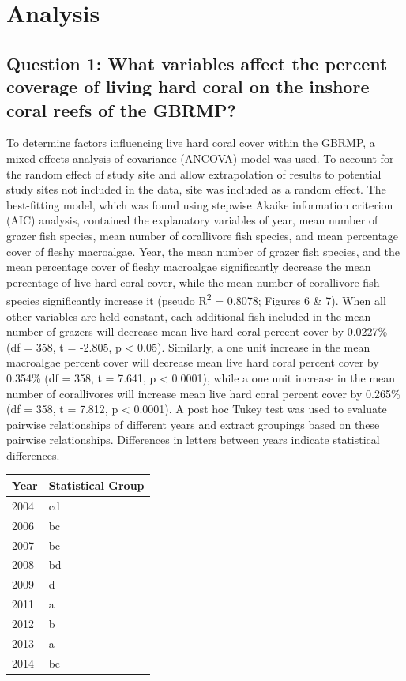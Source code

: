 \documentclass[12pt,]{article}
\begin{document}
\newpage

\hypertarget{analysis}{%
\section{Analysis}\label{analysis}}

\hypertarget{question-1-what-variables-affect-the-percent-coverage-of-living-hard-coral-on-the-inshore-coral-reefs-of-the-gbrmp}{%
\subsection{Question 1: What variables affect the percent coverage of
living hard coral on the inshore coral reefs of the
GBRMP?}\label{question-1-what-variables-affect-the-percent-coverage-of-living-hard-coral-on-the-inshore-coral-reefs-of-the-gbrmp}}

To determine factors influencing live hard coral cover within the GBRMP,
a mixed-effects analysis of covariance (ANCOVA) model was used. To
account for the random effect of study site and allow extrapolation of
results to potential study sites not included in the data, site was
included as a random effect. The best-fitting model, which was found
using stepwise Akaike information criterion (AIC) analysis, contained
the explanatory variables of year, mean number of grazer fish species,
mean number of corallivore fish species, and mean percentage cover of
fleshy macroalgae. Year, the mean number of grazer fish species, and the
mean percentage cover of fleshy macroalgae significantly decrease the
mean percentage of live hard coral cover, while the mean number of
corallivore fish species significantly increase it (pseudo
R\textsuperscript{2} = 0.8078; Figures 6 \& 7). When all other variables
are held constant, each additional fish included in the mean number of
grazers will decrease mean live hard coral percent cover by 0.0227\% (df
= 358, t = -2.805, p \textless{} 0.05). Similarly, a one unit increase
in the mean macroalgae percent cover will decrease mean live hard coral
percent cover by 0.354\% (df = 358, t = 7.641, p \textless{} 0.0001),
while a one unit increase in the mean number of corallivores will
increase mean live hard coral percent cover by 0.265\% (df = 358, t =
7.812, p \textless{} 0.0001). A post hoc Tukey test was used to evaluate
pairwise relationships of different years and extract groupings based on
these pairwise relationships. Differences in letters between years
indicate statistical differences.

\begin{longtable}[]{@{}ll@{}}
\toprule
Year & Statistical Group\tabularnewline
\midrule
\endhead
2004 & cd\tabularnewline
2006 & bc\tabularnewline
2007 & bc\tabularnewline
2008 & bd\tabularnewline
2009 & d\tabularnewline
2011 & a\tabularnewline
2012 & b\tabularnewline
2013 & a\tabularnewline
2014 & bc\tabularnewline
\bottomrule
\end{longtable}
\end{document}
